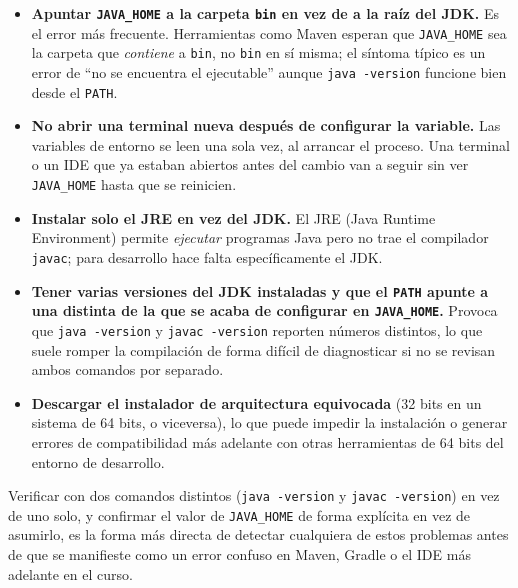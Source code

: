 \documentclass[10pt,a4paper]{article}
\begin{document}
\begin{itemize}
	\item \textbf{Apuntar \texttt{JAVA\_HOME} a la carpeta \texttt{bin} en vez de a la raíz del JDK.} Es el error más frecuente. Herramientas como Maven esperan que \texttt{JAVA\_HOME} sea la carpeta que \textit{contiene} a \texttt{bin}, no \texttt{bin} en sí misma; el síntoma típico es un error de \enquote{no se encuentra el ejecutable} aunque \texttt{java -version} funcione bien desde el \texttt{PATH}.
	\item \textbf{No abrir una terminal nueva después de configurar la variable.} Las variables de entorno se leen una sola vez, al arrancar el proceso. Una terminal o un IDE que ya estaban abiertos antes del cambio van a seguir sin ver \texttt{JAVA\_HOME} hasta que se reinicien.
	\item \textbf{Instalar solo el JRE en vez del JDK.} El JRE (Java Runtime Environment) permite \textit{ejecutar} programas Java pero no trae el compilador \texttt{javac}; para desarrollo hace falta específicamente el JDK.
	\item \textbf{Tener varias versiones del JDK instaladas y que el \texttt{PATH} apunte a una distinta de la que se acaba de configurar en \texttt{JAVA\_HOME}.} Provoca que \texttt{java -version} y \texttt{javac -version} reporten números distintos, lo que suele romper la compilación de forma difícil de diagnosticar si no se revisan ambos comandos por separado.
	\item \textbf{Descargar el instalador de arquitectura equivocada} (32 bits en un sistema de 64 bits, o viceversa), lo que puede impedir la instalación o generar errores de compatibilidad más adelante con otras herramientas de 64 bits del entorno de desarrollo.
\end{itemize}

Verificar con dos comandos distintos (\texttt{java -version} y \texttt{javac -version}) en vez de uno solo, y confirmar el valor de \texttt{JAVA\_HOME} de forma explícita en vez de asumirlo, es la forma más directa de detectar cualquiera de estos problemas antes de que se manifieste como un error confuso en Maven, Gradle o el IDE más adelante en el curso.

\pagebreak

\section{\color{colorIPN}{Referencias Bibliográficas}}
\color{colorESCOM}{
	\printbibliography[heading=none]
}
\end{document}
